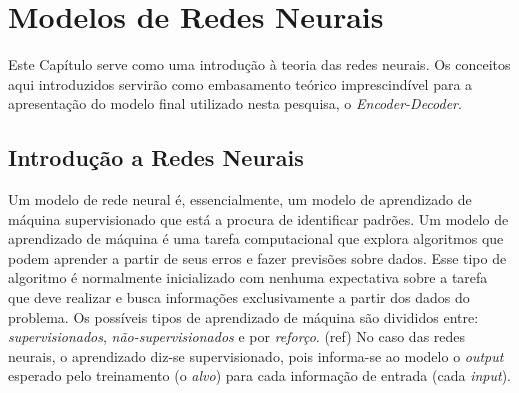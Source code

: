 \chapter{Modelos de Redes Neurais}
\label{ch:03}



Este Capítulo serve como uma introdução à teoria das redes neurais. Os conceitos aqui introduzidos servirão como embasamento teórico imprescindível para a apresentação do modelo final utilizado nesta pesquisa, o \textit{Encoder-Decoder}. 

\section{Introdução a Redes Neurais}

Um modelo de rede neural é, essencialmente, um modelo de aprendizado de máquina supervisionado %
que está a procura de identificar padrões. Um modelo de aprendizado de máquina é uma tarefa computacional que explora algoritmos que podem aprender a partir de seus erros e fazer previsões sobre dados. Esse tipo de algoritmo é normalmente inicializado com nenhuma expectativa sobre a tarefa que deve realizar e busca informações exclusivamente a partir dos dados do problema. Os possíveis tipos de aprendizado de máquina são divididos entre: \textit{supervisionados}, \textit{não-supervisionados}
e por \textit{reforço}. (ref)
No caso das redes neurais, o aprendizado diz-se supervisionado, pois informa-se ao modelo o \textit{output} esperado  pelo treinamento (o \textit{alvo}) para cada informação de entrada (cada \textit{input}).

